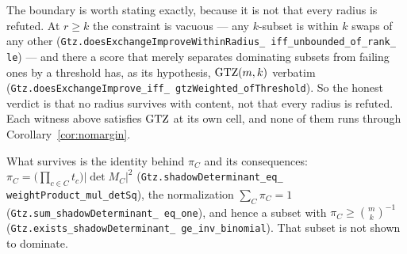 The boundary is worth stating exactly, because it is not that every radius
is refuted.  At $r\ge k$ the constraint is vacuous --- any $k$-subset is
within $k$ swaps of any other
(\texttt{Gtz.does\allowbreak Exchange\allowbreak Improve\allowbreak Within\allowbreak Radius\_\allowbreak
iff\_\allowbreak unbounded\_\allowbreak of\_\allowbreak rank\_\allowbreak
le}) --- and there a score that merely separates dominating subsets from
failing ones by a threshold has, as its hypothesis, $\mathrm{GTZ}(m,k)$ verbatim
(\texttt{Gtz.does\allowbreak Exchange\allowbreak Improve\_\allowbreak iff\_\allowbreak
gtz\allowbreak Weighted\_\allowbreak of\allowbreak Threshold}).  So the honest verdict is that no
radius survives with content, not that every radius is refuted.  Each
witness above satisfies $\mathrm{GTZ}$ at its own cell, and none of them runs
through Corollary~\ref{cor:nomargin}.

What survives is the identity behind $\pi_C$ and its consequences:
$\pi_C=\bigl(\prod_{c\in C}t_c\bigr)\lvert\det M_C\rvert^2$
(\texttt{Gtz.shadow\allowbreak Determinant\_\allowbreak eq\_\allowbreak
weight\allowbreak Product\_\allowbreak mul\_\allowbreak det\allowbreak Sq}), the normalization
$\sum_C\pi_C=1$ (\texttt{Gtz.sum\_\allowbreak shadow\allowbreak Determinant\_\allowbreak
eq\_one}), and hence a subset with
$\pi_C\ge\binom{m}{k}^{-1}$
(\texttt{Gtz.exists\_\allowbreak shadow\allowbreak Determinant\_\allowbreak
ge\_\allowbreak inv\_\allowbreak binomial}).  That subset is not shown to
dominate.

\fussy
